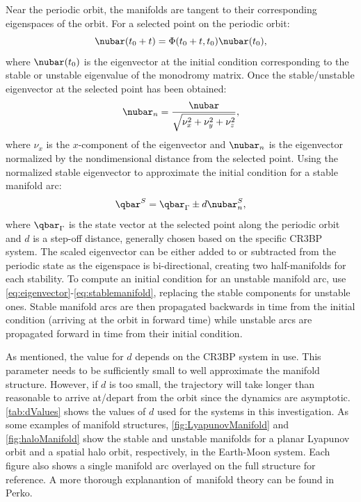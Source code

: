 Near the periodic orbit, the manifolds are tangent to their corresponding eigenspaces of the orbit.
For a selected point on the periodic orbit:
\begin{equation}
    \nubar(t_{0}+t)=\Phi(t_{0}+t,t_{0})\nubar(t_{0}),
    \label{eq:eigenvector}
\end{equation}
where $\nubar(t_{0})$ is the eigenvector at the initial condition corresponding to the stable or
unstable eigenvalue of the monodromy matrix. Once the stable/unstable eigenvector at the selected
point has been obtained:
\begin{equation}
    \nubar_{n}=\frac{\nubar}{\sqrt{\nu_{x}^{2}+\nu_{y}^{2}+\nu_{z}^{2}}},
    \label{eq:normeigenvector}
\end{equation}
where $\nu_{x}$ is the $x$-component of the eigenvector and $\nubar_{n}$ is the eigenvector
normalized by the nondimensional distance from the selected point. Using the normalized
stable eigenvector to approximate the initial condition for a stable manifold arc:
\begin{equation}
    \qbar^{S}=\qbar_{\Gamma}\pm d\nubar_{n}^{S},
    \label{eq:stablemanifold}
\end{equation}
where $\qbar_{\Gamma}$ is the state vector at the selected point along the periodic orbit and $d$
is a step-off distance, generally chosen based on the specific CR3BP system. The scaled eigenvector
can be either added to or subtracted from the periodic state as the eigenspace is bi-directional,
creating two half-manifolds for each stability. To compute an initial condition for an unstable
manifold arc, use \cref{eq:eigenvector}-\cref{eq:stablemanifold}, replacing the stable components
for unstable ones. Stable manifold arcs are then propagated backwards in time from the initial
condition (arriving at the orbit in forward time) while unstable arcs are propagated forward in
time from their initial condition.

As mentioned, the value for $d$ depends on the CR3BP system in use. This parameter needs to be
sufficiently small to well approximate the manifold structure. However, if $d$ is too small, the
trajectory will take longer than reasonable to arrive at/depart from the orbit since the dynamics
are asymptotic\cite{Kakoi:2015}. \cref{tab:dValues} shows the values of $d$ used for the systems in
this investigation. As some examples of manifold structures, \cref{fig:LyapunovManifold} and
\cref{fig:haloManifold} show the stable and unstable manifolds for a planar Lyapunov orbit and a
spatial halo orbit, respectively, in the Earth-Moon system. Each figure also shows a single
manifold arc overlayed on the full structure for reference. A more thorough explanantion of\
manifold theory can be found in Perko\cite{Perko:1991}.

